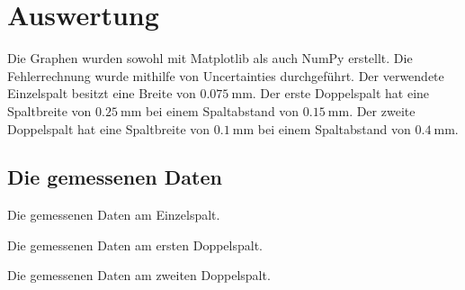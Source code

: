 \section{Auswertung}
\label{sec:Auswertung}


Die Graphen wurden sowohl mit Matplotlib \cite{matplotlib} als auch NumPy \cite{numpy} erstellt. Die
Fehlerrechnung wurde mithilfe von Uncertainties \cite{uncertainties} durchgeführt.
Der verwendete Einzelspalt besitzt eine Breite von $\SI{0.075}{\milli\meter}$. Der erste Doppelspalt
 hat eine Spaltbreite von $\SI{0.25}{\milli\meter}$ bei einem Spaltabstand von $\SI{0.15}{\milli\meter}$.
 Der zweite Doppelspalt
 hat eine Spaltbreite von $\SI{0.1}{\milli\meter}$ bei einem Spaltabstand von $\SI{0.4}{\milli\meter}$.
\subsection{Die gemessenen Daten}
\begin{table}
 \centering
 \caption{Die gemessenen Daten am Einzelspalt.}
 
 \label{tab:einzel}
\end{table}

\begin{table}
 \centering
 \caption{Die gemessenen Daten am ersten Doppelspalt.}
 
 \label{tab:ds12}
 
\end{table}

\begin{table}
 \centering
 \caption{Die gemessenen Daten am zweiten Doppelspalt.}
 
 \label{tab:ds2}
 
\end{table}

